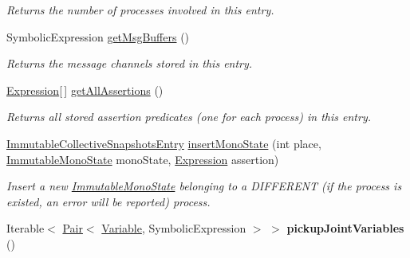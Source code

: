 \begin{DoxyCompactItemize}
\begin{DoxyCompactList}\small\item\em Returns the number of processes involved in this entry. \end{DoxyCompactList}\item 
Symbolic\+Expression \hyperlink{interfaceedu_1_1udel_1_1cis_1_1vsl_1_1civl_1_1state_1_1IF_1_1CollectiveSnapshotsEntry_a41f3b2e873b8f0e650cab149bbe4f129}{get\+Msg\+Buffers} ()
\begin{DoxyCompactList}\small\item\em Returns the message channels stored in this entry. \end{DoxyCompactList}\item 
\hyperlink{interfaceedu_1_1udel_1_1cis_1_1vsl_1_1civl_1_1model_1_1IF_1_1expression_1_1Expression}{Expression}\mbox{[}$\,$\mbox{]} \hyperlink{interfaceedu_1_1udel_1_1cis_1_1vsl_1_1civl_1_1state_1_1IF_1_1CollectiveSnapshotsEntry_a9ff5196638717b52fd4944aa2e57af48}{get\+All\+Assertions} ()
\begin{DoxyCompactList}\small\item\em Returns all stored assertion predicates (one for each process) in this entry. \end{DoxyCompactList}\item 
\hyperlink{classedu_1_1udel_1_1cis_1_1vsl_1_1civl_1_1state_1_1common_1_1immutable_1_1ImmutableCollectiveSnapshotsEntry}{Immutable\+Collective\+Snapshots\+Entry} \hyperlink{interfaceedu_1_1udel_1_1cis_1_1vsl_1_1civl_1_1state_1_1IF_1_1CollectiveSnapshotsEntry_a28e4eebde6d0acc743f1ad11705057b9}{insert\+Mono\+State} (int place, \hyperlink{classedu_1_1udel_1_1cis_1_1vsl_1_1civl_1_1state_1_1common_1_1immutable_1_1ImmutableMonoState}{Immutable\+Mono\+State} mono\+State, \hyperlink{interfaceedu_1_1udel_1_1cis_1_1vsl_1_1civl_1_1model_1_1IF_1_1expression_1_1Expression}{Expression} assertion)
\begin{DoxyCompactList}\small\item\em Insert a new \hyperlink{}{Immutable\+Mono\+State} belonging to a D\+I\+F\+F\+E\+R\+E\+N\+T (if the process is existed, an error will be reported) process. \end{DoxyCompactList}\item 
\hypertarget{interfaceedu_1_1udel_1_1cis_1_1vsl_1_1civl_1_1state_1_1IF_1_1CollectiveSnapshotsEntry_a10b8e1a775b3a8d008cd451d98791ec2}{}Iterable$<$ \hyperlink{classedu_1_1udel_1_1cis_1_1vsl_1_1civl_1_1util_1_1IF_1_1Pair}{Pair}$<$ \hyperlink{interfaceedu_1_1udel_1_1cis_1_1vsl_1_1civl_1_1model_1_1IF_1_1variable_1_1Variable}{Variable}, Symbolic\+Expression $>$ $>$ {\bfseries pickup\+Joint\+Variables} ()\label{interfaceedu_1_1udel_1_1cis_1_1vsl_1_1civl_1_1state_1_1IF_1_1CollectiveSnapshotsEntry_a10b8e1a775b3a8d008cd451d98791ec2}


\end{DoxyCompactItemize}
